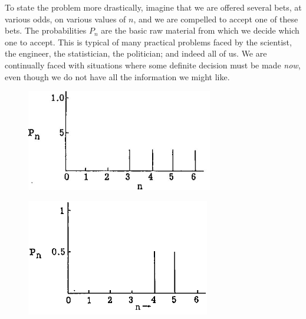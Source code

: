 \documentclass[]{article}
\begin{document}
To state the problem more drastically, imagine that we are offered
several bets, at various odds, on various values of \(n\), and we are
compelled to accept one of these bets. The probabilities \(P_{n}\) are
the basic raw material from which we decide which one to accept. This is
typical of many practical problems faced by the scientist, the engineer,
the statistician, the politician; and indeed all of us. We are
continually faced with situations where some definite decision must be
made \emph{now}, even though we do not have all the information we might
like.

%
\begin{figure}
    \centering
    \includegraphics[width=3.20866in,height=1.75197in]{media/image1.jpeg}
    \caption{}
    \label{fig-one}
\end{figure}
%
\begin{figure}
    \centering
    \includegraphics[width=3.16142in,height=2in]{media/image2.png}
    \caption{}
    \label{fig-two}
\end{figure}
\end{document}

